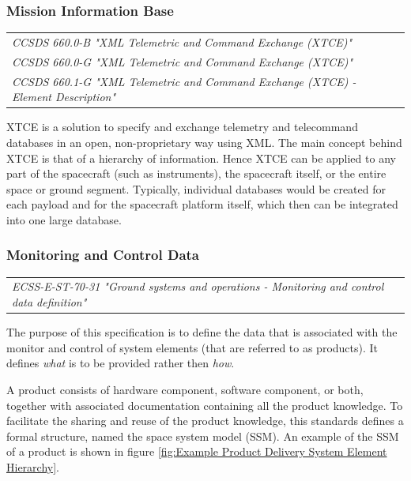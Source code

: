 \subsubsection{Mission Information Base}

\begin{tabular}{l}
\textit{CCSDS 660.0-B "XML Telemetric and Command Exchange (XTCE)" \cite{CCSDS-660.0-B}} \\
\textit{CCSDS 660.0-G "XML Telemetric and Command Exchange (XTCE)" \cite{CCSDS-660.0-G}} \\
\textit{CCSDS 660.1-G "XML Telemetric and Command Exchange (XTCE) - Element Description" \cite{CCSDS-660.1-G}} \\
\end{tabular}

XTCE is a solution to specify and exchange telemetry and telecommand databases in an open, non-proprietary way using XML. The main concept behind XTCE is that of a hierarchy of information. Hence XTCE can be applied to any part of the spacecraft (such as instruments), the spacecraft itself, or the entire space or ground segment. Typically, individual databases would be created for each payload and for the spacecraft platform itself, which then can be integrated into one large database. 

\subsubsection{Monitoring and Control Data}

\begin{tabular}{l}
\textit{ECSS-E-ST-70-31 "Ground systems and operations - Monitoring and control data definition" \cite{ECSS-E-ST-70-31}} \\
\end{tabular}

The purpose of this specification is to define the data that is associated with the monitor and control of system elements (that are referred to as products). It defines \textsl{what} is to be provided rather then \textsl{how}.

A product consists of hardware component, software component, or both, together with associated documentation containing all the product knowledge. To facilitate the sharing and reuse of the product knowledge, this standards defines a formal structure, named the space system model (SSM). An example of the SSM of a product is shown in figure \ref{fig:Example Product Delivery System Element Hierarchy}.

